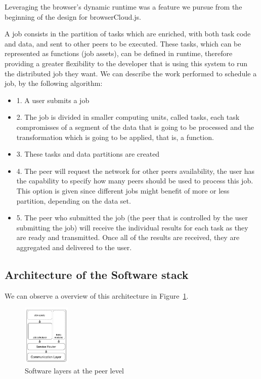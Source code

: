 Leveraging the browser's dynamic runtime was a feature we pursue from the beginning of the design for browserCloud.js.


A job consists in the partition of tasks which are enriched, with both task code and data, and sent to other peers to be executed. These tasks, which can be represented as functions (job assets), can be defined in runtime, therefore providing a greater flexibility to the developer that is using this system to run the distributed job they want. We can describe the work performed to schedule a job, by the following algorithm:

\begin{itemize}
    \item 1. A user submits a job
    \item 2. The job is divided in smaller computing units, called tasks, each task compromisses of a segment of the data that is going to be processed and the transformation which is going to be applied, that is, a function.
    \item 3. These tasks and data partitions are created
    \item 4. The peer will request the network for other peers availability, the user has the capability to specify how many peers should be used to process this job. This option is given since different jobs might benefit of more or less partition, depending on the data set.
    \item 5. The peer who submitted the job (the peer that is controlled by the user submitting the job) will receive the individual results for each task as they are ready and transmitted. Once all of the results are received, they are aggregated and delivered to the user.
\end{itemize}

\subsection{Architecture of the Software stack}

We can observe a overview of this architecture in Figure~\ref{fig:s-a-n-l}.

\begin{figure}[h!]
  \centering
  \includegraphics[width=0.2\textwidth]{figs/software-architecture-node-level}
  \caption{Software layers at the peer level}
  \label{fig:s-a-n-l}
\end{figure}


